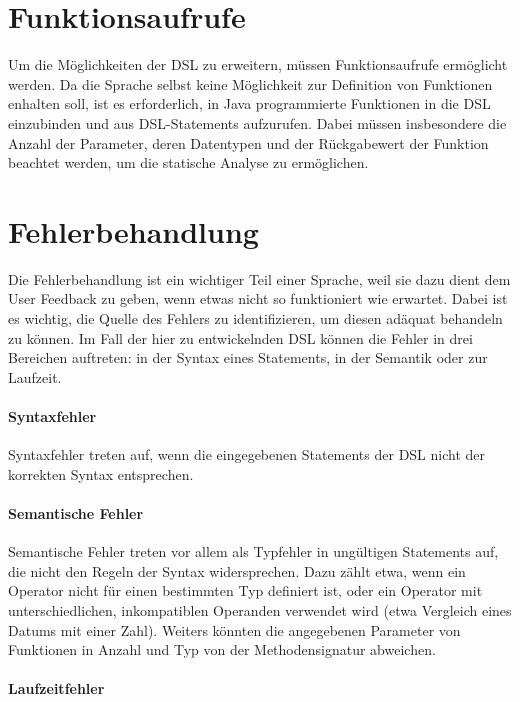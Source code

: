 \section{Funktionsaufrufe}
\label{section_analyse_funktionsaufrufe}

Um die Möglichkeiten der DSL zu erweitern, müssen Funktionsaufrufe er\-mög\-licht werden. Da die Sprache selbst keine Möglichkeit zur Definition von Funktionen enhalten soll, ist es erforderlich, in Java programmierte Funktionen in die DSL einzubinden und aus DSL-Statements aufzurufen. Dabei müssen insbesondere die Anzahl der Parameter, deren Datentypen und der Rückgabewert der Funktion beachtet werden, um die statische Analyse zu ermöglichen.


\section{Fehlerbehandlung}
\label{section_analyse_fehlerbehandlung}

Die Fehlerbehandlung ist ein wichtiger Teil einer Sprache, weil sie dazu dient dem User Feedback zu geben, wenn etwas nicht so funktioniert wie erwartet. Dabei ist es wichtig, die Quelle des Fehlers zu identifizieren, um diesen adäquat behandeln zu können. Im Fall der hier zu entwickelnden DSL können die Fehler in drei Bereichen auftreten: in der Syntax eines Statements, in der Semantik oder zur Laufzeit. 

\paragraph*{Syntaxfehler}
Syntaxfehler treten auf, wenn die eingegebenen Statements der DSL nicht der korrekten Syntax entsprechen. 

\paragraph*{Semantische Fehler}

Semantische Fehler treten vor allem als Typfehler in ungültigen Statements auf, die nicht den Regeln der Syntax widersprechen. Dazu zählt etwa, wenn ein Operator nicht für einen bestimmten Typ definiert ist, oder ein Operator mit unterschiedlichen, inkompatiblen Operanden verwendet wird (etwa Vergleich eines Datums mit einer Zahl). Weiters könnten die angegebenen Parameter von Funktionen in Anzahl und Typ von der Methodensignatur abweichen.

\paragraph*{Laufzeitfehler}

